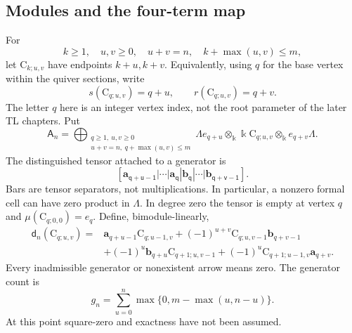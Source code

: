 \documentclass[a4paper,11pt,oneside,reqno]{amsart}
\theoremstyle{definition}
\numberwithin{equation}{section}
\begin{document}
\subsection{Modules and the four-term map}
For
\begin{equation}\label{eq:indices}
 k\ge1,\quad u,v\ge0,\quad u+v=n,\quad k+\max(u,v)\le m,
\end{equation}
let $\mathrm C_{k;u,v}$ have endpoints $k+u,k+v$. Equivalently, using
$q$ for the base vertex within the quiver sections, write
\begin{equation}\label{eq:endpoints}
 s(\mathrm C_{q;u,v})=q+u,\qquad r(\mathrm C_{q;u,v})=q+v.
\end{equation}
The letter $q$ here is an integer vertex index, not the root parameter
of the later TL chapters. Put
\begin{equation}\label{eq:Pn}
 \mathsf A_n=\bigoplus_{\substack{q\ge1,\ u,v\ge0\\
 u+v=n,\ q+\max(u,v)\le m}}
 \Lambda e_{q+u}\otimes_{\Bbbk}\Bbbk\mathrm C_{q;u,v}
 \otimes_{\Bbbk}e_{q+v}\Lambda.
\end{equation}
The distinguished tensor attached to a generator is
\begin{equation}\label{eq:chains}
 \mathsf{[\mathbf a_{q+u-1}|\cdots|\mathbf a_q|
 \mathbf b_q|\cdots|\mathbf b_{q+v-1}]}.
\end{equation}
Bars are tensor separators, not multiplications. In particular, a
nonzero formal cell can have zero product in $\Lambda$.
In degree zero the tensor is empty at vertex $q$ and
$\mu(\mathrm C_{q;0,0})=e_q$. Define, bimodule-linearly,
\begin{equation}\label{eq:main-differential}
 \boxed{\begin{aligned}
 \mathsf d_n(\mathrm C_{q;u,v})={}&
 \mathbf a_{q+u-1}\mathrm C_{q;u-1,v}
 +(-1)^{u+v}\mathrm C_{q;u,v-1}\mathbf b_{q+v-1}\\
 &+(-1)^u\mathbf b_{q+u}\mathrm C_{q+1;u,v-1}
 +(-1)^u\mathrm C_{q+1;u-1,v}\mathbf a_{q+v}.
 \end{aligned}}
\end{equation}
Every inadmissible generator or nonexistent arrow means zero.
The generator count is
\begin{equation}\label{eq:count}
 g_n=\sum_{u=0}^n\max\{0,m-\max(u,n-u)\}.
\end{equation}
At this point square-zero and exactness have not been assumed.
\end{document}
